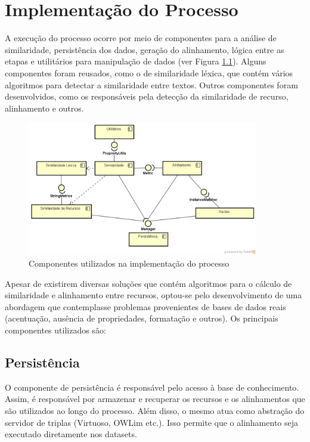 \chapter{Implementação do Processo}

A execução do processo ocorre por meio de componentes para a análise de similaridade, persistência dos dados, geração do alinhamento, lógica entre as etapas e utilitários para manipulação de dados (ver Figura \ref{fig:componentes}). Alguns componentes foram reusados, como o de similaridade léxica, que contém vários algoritmos para detectar a similaridade entre textos. Outros componentes foram desenvolvidos, como os responsáveis pela detecção da similaridade de recurso, alinhamento e outros.

\begin{figure}[!ht]
	\centering
	\includegraphics[width=0.9\textwidth]{./imagens/componentes.png}
    \caption{Componentes utilizados na implementação do processo}
	\label{fig:componentes}
\end{figure}

Apesar de existirem diversas soluções que contém algoritmos para o cálculo de similaridade e alinhamento entre recursos, optou-se pelo desenvolvimento de uma abordagem que contemplasse problemas provenientes de bases de dados reais (acentuação, ausência de propriedades, formatação e outros).
Os principais componentes utilizados são:

\section*{Persistência}
O componente de persistência é responsável pelo acesso à base de conhecimento. Assim, é responsável por armazenar e recuperar os recursos e os alinhamentos que são utilizados ao longo do processo. Além disso, o mesmo atua como abstração do servidor de triplas (Virtuoso, OWLim etc.). Isso permite que o alinhamento seja executado diretamente nos datasets.


